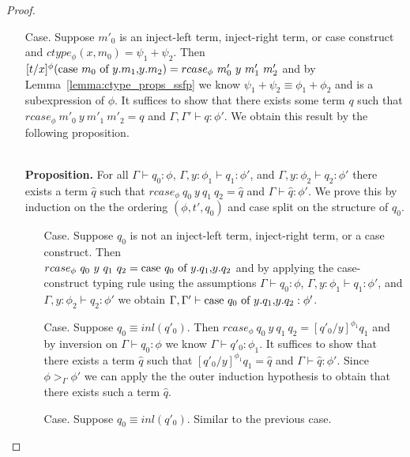 \begin{proof}
\begin{itemize}
\begin{itemize}
  \item[Case.] Suppose $m'_0$ is an inject-left term, inject-right term, or case construct and $ctype_\phi(x,m_0) = \psi_1+\psi_2$.  Then\\
    $[t/x]^{\phi} (\mbox{case}\ m_0\ \text{of}\ y\text{.}m_1\text{,}y\text{.}m_2) = rcase_{\phi}\ m'_0\ y\ m'_1\ m'_2$ and by Lemma~\ref{lemma:ctype_props_ssfp} we know
    $\psi_1 + \psi_2 \equiv \phi_1+\phi_2$ and is a subexpression of $\phi$.
    It suffices to show that there exists some term
    $q$ such that $rcase_{\phi}\ m'_0\ y\ m'_1\ m'_2 = q$ and $\Gamma, \Gamma' \vdash q:\phi'$.  We obtain this
    result by the following proposition.
    
    \ \\
    {\bf Proposition.} For all $\Gamma \vdash q_0:\phi$, $\Gamma, y:\phi_1 \vdash q_1:\phi'$, 
    and $\Gamma, y:\phi_2 \vdash q_2:\phi'$ there exists a term $\hat{q}$ such that 
    $rcase_{\phi}\ q_0\ y\ q_1\ q_2 = \hat{q}$ and $\Gamma \vdash \hat{q}:\phi'$.  
    We prove this by induction on the the ordering $(\phi, t', q_0)$ and case split on the structure of $q_0$.
    \begin{itemize}
    \item[Case.] Suppose $q_0$ is not an inject-left term, inject-right term, or a case construct.  Then\\
      $rcase_{\phi}\ q_0\ y\ q_1\ q_2 = \mbox{case}\ q_0\ \text{of}\ y\text{.}q_1\text{,}y\text{.}q_2$ and by applying the case-construct typing rule
      using the assumptions $\Gamma \vdash q_0:\phi$, $\Gamma, y:\phi_1 \vdash q_1:\phi'$, 
      and $\Gamma, y:\phi_2 \vdash q_2:\phi'$ we obtain $\Gamma,\Gamma' \vdash \mbox{case}\ q_0\ \text{of}\ y\text{.}q_1\text{,}y\text{.}q_2:\phi'$.
      
    \item[Case.] Suppose $q_0 \equiv inl(q'_0)$.  Then $rcase_{\phi}\ q_0\ y\ q_1\ q_2 = [q'_0/y]^{\phi_1} q_1$ and
      by inversion on $\Gamma \vdash q_0:\phi$ we know $\Gamma \vdash q'_0:\phi_1$.  It suffices to show that there
      exists a term $\hat{q}$ such that $[q'_0/y]^{\phi_1} q_1 = \hat{q}$  and $\Gamma \vdash \hat{q}:\phi'$.  
      Since $\phi >_{\Gamma} \phi'$ we can apply the the outer induction hypothesis to obtain that there exists 
      such a term $\hat{q}$.
      
    \item[Case.] Suppose $q_0 \equiv inl(q'_0)$.  Similar to the previous case.
      

\end{itemize}
\end{itemize}
\end{itemize}
\end{proof}
